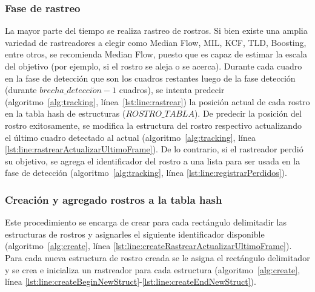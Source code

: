 \documentclass[a4paper,openright,12pt]{report}
\begin{document}
\subsubsection{Fase de rastreo}
La mayor parte del tiempo se realiza rastreo de rostros. Si bien existe una
amplia variedad de rastreadores a elegir como Median Flow, MIL, KCF, TLD,
Boosting, entre otros, se recomienda Median Flow, puesto que es capaz de
estimar la escala del objetivo (por ejemplo, si el rostro se aleja o se acerca).
Durante cada cuadro en la fase de detección que son los cuadros restantes
luego de la fase detección (durante $brecha\_detecci\acute on - 1$ cuadros), se
intenta predecir (algoritmo~\ref{alg:tracking}, línea~\ref{lst:line:rastrear})
la posición actual de cada rostro en la tabla hash de estructuras
($ROSTRO\_TABLA$). De predecir la posición del rostro exitosamente, se modifica
la estructura del rostro respectivo actualizando el último cuadro detectado al
actual (algoritmo~\ref{alg:tracking},
línea \ref{lst:line:rastrearActualizarUltimoFrame}). De lo contrario,
si el rastreador perdió su objetivo, se agrega el identificador del rostro a una
lista para ser usada en la fase de detección (algoritmo~\ref{alg:tracking},
línea \ref{lst:line:registrarPerdidos}).\\


\subsubsection{Creación y agregado rostros a la tabla hash} \label{sssec:create}
Este procedimiento se encarga de crear para cada rectángulo delimitadir las
estructuras de rostros y asignarles el siguiente identificador disponible
(algoritmo~\ref{alg:create},
línea \ref{lst:line:createRastrearActualizarUltimoFrame}). Para cada nueva
estructura de rostro creada se le asigna el rectángulo delimitador y se crea e
inicializa un rastreador para cada estructura (algoritmo~\ref{alg:create},
línea \ref{lst:line:createBeginNewStruct}-\ref{lst:line:createEndNewStruct}).\\
\end{document}

